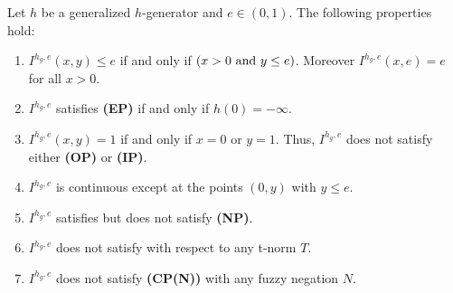 \begin{theorem}\label{th:AddProp(h,e)} Let $h$ be a generalized $h$-generator and $e \in (0,1)$. The following properties hold:
	\begin{enumerate}[label=(\roman*)]
		\item $I^{h_g,e}(x,y) \leq e$ if and only if $(x>0 \hbox{ and } y \leq e)$. Moreover $I^{h_g,e}(x,e)=e$ for all $x>0$.
		\item $I^{h_g,e}$ satisfies {\bf (EP)} if and only if $h(0)=-\infty$.
		\item $I^{h_g,e}(x,y)=1$ if and only if $x=0$ or $y=1$. Thus, $I^{h_g,e}$ does not satisfy either {\bf (OP)} or {\bf (IP)}.
		\item $I^{h_g,e}$ is continuous except at the points $(0,y)$ with $y \leq e$.
		\item $I^{h_g,e}$ satisfies \NPe but does not satisfy {\bf (NP)}.
		\item $I^{h_g,e}$ does not satisfy \LI with respect to any t-norm $T$.
		\item $I^{h_g,e}$ does not satisfy {\bf (CP(N))} with any fuzzy negation $N$.
	\end{enumerate}
	\label{propietats1(h,e)}
\end{theorem}
